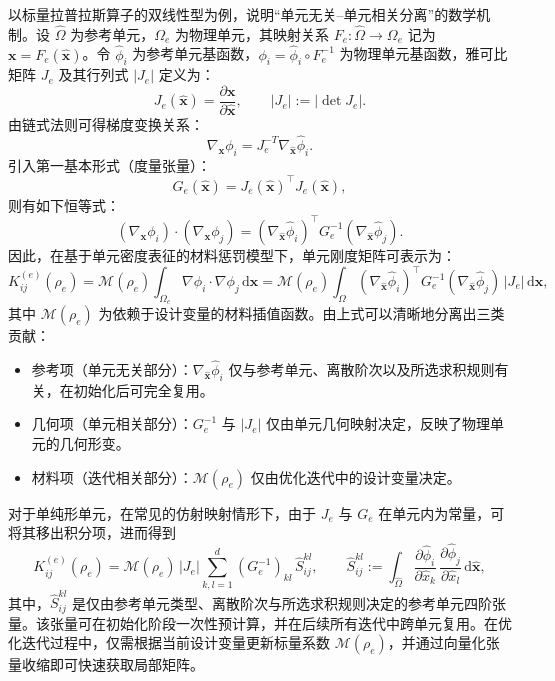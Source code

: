 以标量拉普拉斯算子的双线性型为例，说明“单元无关--单元相关分离”的数学机制。设 $\hat{\Omega}$ 为参考单元，$\Omega_e$ 为物理单元，其映射关系 $F_e:\hat{\Omega}\to\Omega_e$ 记为 $\boldsymbol{x}=F_e(\hat{\boldsymbol{x}})$。令 $\hat{\phi}_i$ 为参考单元基函数，$\phi_i=\hat{\phi}_i\circ F_e^{-1}$ 为物理单元基函数，雅可比矩阵 $J_e$ 及其行列式 $|J_e|$ 定义为： 
\[
J_e(\hat{\boldsymbol{x}})=\frac{\partial \boldsymbol{x}}{\partial \hat{\boldsymbol{x}}},\qquad |J_e|:=|\det J_e|.
\]
由链式法则可得梯度变换关系：
\[
\nabla_{\boldsymbol{x}}\phi_i =J_e^{-T}\nabla_{\hat{\boldsymbol{x}}}\hat{\phi}_i.
\]
引入第一基本形式（度量张量）：
\[
G_e(\hat{\boldsymbol{x}})=J_e(\hat{\boldsymbol{x}})^{\top}J_e(\hat{\boldsymbol{x}}),
\]
则有如下恒等式：
\[
(\nabla_{\boldsymbol{x}}\phi_i)\cdot(\nabla_{\boldsymbol{x}}\phi_j) =(\nabla_{\hat{\boldsymbol{x}}}\hat{\phi}_i)^{\top}G_e^{-1}(\nabla_{\hat{\boldsymbol{x}}}\hat{\phi}_j).
\]
因此，在基于单元密度表征的材料惩罚模型下，单元刚度矩阵可表示为：
\[
K^{(e)}_{ij}(\rho_e) = \mathcal{M}(\rho_e) \int_{\Omega_e}\nabla\phi_i\cdot\nabla\phi_j\,\mathrm d\boldsymbol{x} = \mathcal{M}(\rho_e) \int_{\hat{\Omega}}(\nabla_{\hat{\boldsymbol{x}}}\hat{\phi}_i)^{\top}G_e^{-1}(\nabla_{\hat{\boldsymbol{x}}}\hat{\phi}_j)\,|J_e|\,\mathrm d\hat{\boldsymbol{x}},
\]
其中 $\mathcal{M}(\rho_e)$ 为依赖于设计变量的材料插值函数。由上式可以清晰地分离出三类贡献：
\begin{itemize}
	\item 参考项（单元无关部分）：$\nabla_{\hat{\boldsymbol{x}}} \hat{\phi}_i$ 仅与参考单元、离散阶次以及所选求积规则有关，在初始化后可完全复用。
	
	\item 几何项（单元相关部分）：$G_e^{-1}$ 与 $|J_e|$ 仅由单元几何映射决定，反映了物理单元的几何形变。
	
	\item 材料项（迭代相关部分）：$\mathcal{M}(\rho_e)$ 仅由优化迭代中的设计变量决定。
\end{itemize}

对于单纯形单元，在常见的仿射映射情形下，由于 $J_e$ 与 $G_e$ 在单元内为常量，可将其移出积分项，进而得到
\[
K^{(e)}_{ij}(\rho_e) = \mathcal{M}(\rho_e) \, |J_e| \sum_{k,l=1}^{d}(G_e^{-1})_{kl}\,\hat{S}^{kl}_{ij}, \qquad \hat{S}^{kl}_{ij}:=\int_{\hat{\Omega}} \frac{\partial \hat{\phi}_i}{\partial \hat{x}_k}\, \frac{\partial \hat{\phi}_j}{\partial \hat{x}_l}\, \mathrm d\hat{\boldsymbol{x}},
\]
其中，$\hat{S}^{kl}_{ij}$ 是仅由参考单元类型、离散阶次与所选求积规则决定的参考单元四阶张量。该张量可在初始化阶段一次性预计算，并在后续所有迭代中跨单元复用。在优化迭代过程中，仅需根据当前设计变量更新标量系数 $\mathcal{M}(\rho_e)$，并通过向量化张量收缩即可快速获取局部矩阵。


